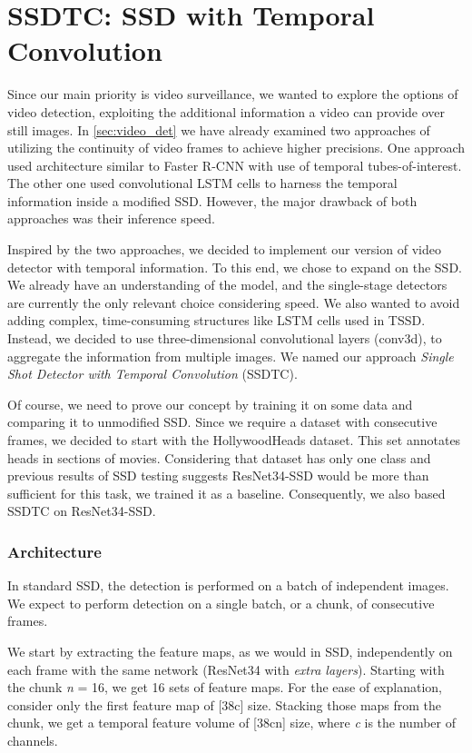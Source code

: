 \section{SSDTC: SSD with Temporal Convolution}
\label{sec:ssdtc}
Since our main priority is video surveillance, we wanted to explore the options of video detection, exploiting the additional information a video can provide over still images. In \cref{sec:video_det} we have already examined two approaches of utilizing the continuity of video frames to achieve higher precisions. One approach used architecture similar to Faster R-CNN with use of temporal tubes-of-interest. The other one used convolutional LSTM cells to harness the temporal information inside a modified SSD. However, the major drawback of both approaches was their inference speed. 

Inspired by the two approaches, we decided to implement our version of video detector with temporal information. To this end, we chose to expand on the SSD. We already have an understanding of the model, and the single-stage detectors are currently the only relevant choice considering speed. We also wanted to avoid adding complex, time-consuming structures like LSTM cells used in TSSD. Instead, we decided to use three-dimensional convolutional layers (conv3d), to aggregate the information from multiple images. We named our approach \textit{Single Shot Detector with Temporal Convolution} (SSDTC).

Of course, we need to prove our concept by training it on some data and comparing it to unmodified SSD. Since we require a dataset with consecutive frames, we decided to start with the HollywoodHeads dataset. This set annotates heads in sections of movies. Considering that dataset has only one class and previous results of SSD testing suggests ResNet34-SSD would be more than sufficient for this task, we trained it as a baseline. Consequently, we also based SSDTC on ResNet34-SSD.

\subsubsection{Architecture}
In standard SSD, the detection is performed on a batch of independent images. We expect to perform detection on a single batch, or a chunk, of consecutive frames. 

We start by extracting the feature maps, as we would in SSD, independently on each frame with the same network (ResNet34 with \textit{extra layers}). Starting with the chunk \textit{n} = 16, we get 16 sets of feature maps. For the ease of explanation, consider only the first feature map of [38\x c] size. Stacking those maps from the chunk, we get a temporal feature volume of [38\x c\x n] size, where \textit{c} is the number of channels. 

